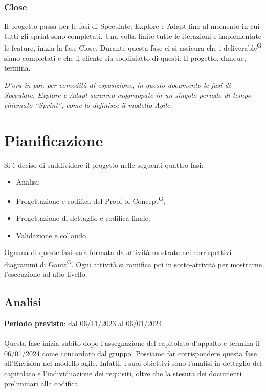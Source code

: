 \subsubsection{Close}\label{sec:modello_sviluppo:agile:close}
Il progetto passa per le fasi di Speculate, Explore e Adapt fino al momento in cui tutti gli sprint sono completati. Una volta finite tutte le iterazioni e implementate le feature, inizia la fase Close.
Durante questa fase ci si assicura che i deliverable\textsuperscript{G} siano completati e che il cliente sia soddisfatto di questi. Il progetto, dunque, termina.
\vspace{20pt}

\noindent \textit{D'ora in poi, per comodità di esposizione, in questo documento le fasi di Speculate, Explore e Adapt saranno raggruppate in un singolo periodo di tempo chiamato ``Sprint'', come lo definisce il modello Agile.}

\newpage
\section{Pianificazione}\label{sec:pianificazione}
Si è deciso di suddividere il progetto nelle seguenti quattro fasi:
\begin{itemize}
    \item Analisi;
    \item Progettazione e codifica del Proof of Concept\textsuperscript{G};
    \item Progettazione di dettaglio e codifica finale;
    \item Validazione e collaudo.
\end{itemize}
Ognuna di queste fasi sarà formata da attività mostrate nei corrispettivi diagrammi di Gantt\textsuperscript{G}. Ogni attività si ramifica poi in sotto-attività per mostrarne l’esecuzione ad alto livello.

\subsection{Analisi}\label{sec:pianificazione:analisi}
\textbf{Periodo previsto}: dal 06/11/2023 al 06/01/2024\\\\
Questa fase inizia subito dopo l'assegnazione del capitolato d'appalto e termina il 06/01/2024 come concordato dal gruppo. 
Possiamo far corrispondere questa fase all'Envision nel modello agile. Infatti, i suoi obiettivi sono l'analisi in dettaglio del capitolato e l'individuazione dei requisiti, oltre che la stesura dei documenti preliminari alla codifica.

